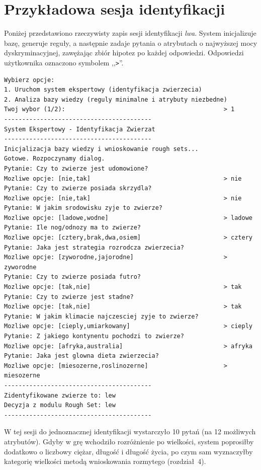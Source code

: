 \documentclass[11pt,a4paper]{article}
\newcommand{\code}[1]{\texttt{#1}}
\begin{document}
\section{Przykładowa sesja identyfikacji}
Poniżej przedstawiono rzeczywisty zapis sesji identyfikacji \textit{lwa}.
System inicjalizuje bazę, generuje reguły, a następnie zadaje pytania
o atrybutach o najwyższej mocy dyskryminacyjnej, zawężając zbiór hipotez po
każdej odpowiedzi. Odpowiedzi użytkownika oznaczono symbolem ,,\code{>}''.

\begin{lstlisting}
Wybierz opcje:
1. Uruchom system ekspertowy (identyfikacja zwierzecia)
2. Analiza bazy wiedzy (reguly minimalne i atrybuty niezbedne)
Twoj wybor (1/2):                                            > 1
-----------------------------------------
System Ekspertowy - Identyfikacja Zwierzat
-----------------------------------------
Inicjalizacja bazy wiedzy i wnioskowanie rough sets...
Gotowe. Rozpoczynamy dialog.
Pytanie: Czy to zwierze jest udomowione?
Mozliwe opcje: [nie,tak]                                     > nie
Pytanie: Czy to zwierze posiada skrzydla?
Mozliwe opcje: [nie,tak]                                     > nie
Pytanie: W jakim srodowisku zyje to zwierze?
Mozliwe opcje: [ladowe,wodne]                                > ladowe
Pytanie: Ile nog/odnozy ma to zwierze?
Mozliwe opcje: [cztery,brak,dwa,osiem]                       > cztery
Pytanie: Jaka jest strategia rozrodcza zwierzecia?
Mozliwe opcje: [zyworodne,jajorodne]                         > zyworodne
Pytanie: Czy to zwierze posiada futro?
Mozliwe opcje: [tak,nie]                                     > tak
Pytanie: Czy to zwierze jest stadne?
Mozliwe opcje: [tak,nie]                                     > tak
Pytanie: W jakim klimacie najczesciej zyje to zwierze?
Mozliwe opcje: [cieply,umiarkowany]                          > cieply
Pytanie: Z jakiego kontynentu pochodzi to zwierze?
Mozliwe opcje: [afryka,australia]                            > afryka
Pytanie: Jaka jest glowna dieta zwierzecia?
Mozliwe opcje: [miesozerne,roslinozerne]                     > miesozerne
-----------------------------------------
Zidentyfikowane zwierze to: lew
Decyzja z modulu Rough Set: lew
-----------------------------------------
\end{lstlisting}

W tej sesji do jednoznacznej identyfikacji wystarczyło 10 pytań (na 12 możliwych
atrybutów). Gdyby w grę wchodziło rozróżnienie po wielkości, system poprosiłby
dodatkowo o liczbowy ciężar, długość i długość życia, po czym sam wyznaczyłby
kategorię wielkości metodą wnioskowania rozmytego (rozdział~4).
\end{document}

